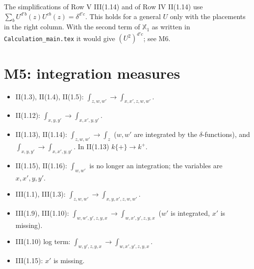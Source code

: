 \documentclass[10pt]{article}
\numberwithin{equation}{section}
\begin{document}
The simplifications of Row V III(1.14) and of Row IV II(1.14) use $\sum_bU^{d'b}(z)U^{cb}(z)=\delta^{d'c}$. This holds for a general $U$ only with the placements in the right column. With the second term of $\mathbb X_1$ as written in \texttt{Calculation\_main.tex} it would give $(U^2)^{d'c}$; see M6.

\section{M5: integration measures}\label{sec:M5}
\begin{itemize}
\item II(1.3), II(1.4), II(1.5): $\int_{z,w,w'}\to\int_{x,x',z,w,w'}$.
\item II(1.12): $\int_{x,y,y'}\to\int_{x,x',y,y'}$.
\item II(1.13), II(1.14): $\int_{z,w,w'}\to\int_z$ ($w,w'$ are integrated by the $\delta$-functions), and $\int_{x,y,y'}\to\int_{x,x',y,y'}$. In II(1.13) $k\{+\}\to k^+$.
\item II(1.15), II(1.16): $\int_{w,w'}$ is no longer an integration; the variables are $x,x',y,y'$.
\item III(1.1), III(1.3): $\int_{z,w,w'}\to\int_{x,y,x',z,w,w'}$.
\item III(1.9), III(1.10): $\int_{w,w',y',z,y,x}\to\int_{w,x',y',z,y,x}$ ($w'$ is integrated, $x'$ is missing).
\item III(1.10) log term: $\int_{w,y',z,y,x}\to\int_{w,x',y',z,y,x}$.
\item III(1.15): $x'$ is missing.
\end{itemize}

\end{document}

